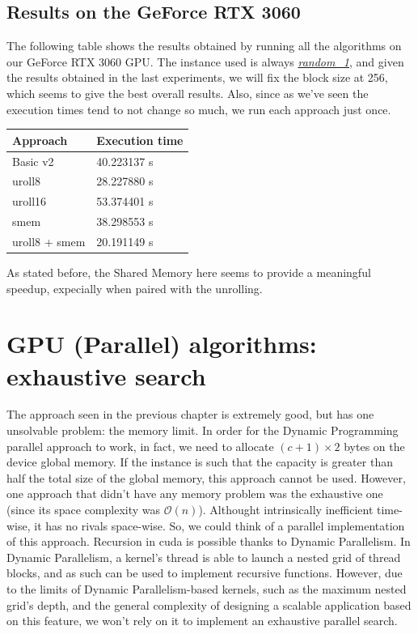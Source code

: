 \documentclass[12pt]{extarticle}
\begin{document}
\subsection{Results on the GeForce RTX 3060}
The following table shows the results obtained by running all the algorithms on our GeForce RTX 3060 GPU. The instance used is always \hyperref[random-1]{\emph{random\_1}}, and given the results obtained in the last experiments, we will fix the block size at 256, which seems to give the best overall results. Also, since as we've seen the execution times tend to not change so much, we run each approach just once.
\begin{center}
\begin{tabular}{ | m{3.2cm} | m{3.2cm} |}
 \hline
 Approach & Execution time\\
 \hline
 Basic v2 & 40.223137 s\\
 \hline
 uroll8 & 28.227880 s\\
 \hline
 uroll16 & 53.374401 s\\
 \hline
 smem & 38.298553 s\\
 \hline
 uroll8 + smem & 20.191149 s\\
 \hline
 \end{tabular}
 \end{center}
As stated before, the Shared Memory here seems to provide a meaningful speedup, expecially when paired with the unrolling.
\section{GPU (Parallel) algorithms: exhaustive search}
\label{GPU-exhaustive-section}
The approach seen in the previous chapter is extremely good, but has one unsolvable problem: the memory limit. In order for the Dynamic Programming parallel approach to work, in fact, we need to allocate $(c + 1) \times 2$ bytes on the device global memory. If the instance is such that the capacity is greater than half the total size of the global memory, this approach cannot be used. However, one approach that didn't have any memory problem was the exhaustive one (since its space complexity was $\mathcal{O}(n)$). Althought intrinsically inefficient time-wise, it has no rivals space-wise. So, we could think of a parallel implementation of this approach.\newline
Recursion in cuda is possible thanks to Dynamic Parallelism. In Dynamic Parallelism, a kernel's thread is able to launch a nested grid of thread blocks, and as such can be used to implement recursive functions. However, due to the limits of Dynamic Parallelism-based kernels, such as the maximum nested grid's depth, and the general complexity of designing a scalable application based on this feature, we won't rely on it to implement an exhaustive parallel search.
\end{document}
